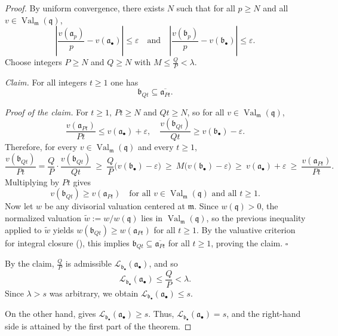 \documentclass[12pt]{amsart}
\newcommand{\m}{\mathfrak m}
\newcommand{\q}{\mathfrak q}
\renewcommand{\a}{\mathfrak{a}}
\renewcommand{\b}{\mathfrak{b}}
\newcommand{\Loj}{\mathcal{L}} %
\DeclareMathOperator{\Val}{Val}
\newcommand{\abul}{{\a_\bullet}}
\newcommand{\bbul}{{\b_\bullet}}
\theoremstyle{plain}
\theoremstyle{definition}
\numberwithin{equation}{section}
\begin{document}
\begin{proof}
	By uniform convergence, there exists $N$ such that for all $p\ge N$ and all $v\in\Val_{\m}(\q)$,
	\[
	\left|\frac{v(\a_p)}{p}-v(\abul)\right|\le \varepsilon
	\quad\text{and}\quad
	\left|\frac{v(\b_p)}{p}-v(\bbul)\right|\le \varepsilon.
	\]
	Choose integers $P\ge N$ and $Q\ge N$ with $M\le \frac{Q}{P}<\lambda.$

		\smallskip
		\noindent
		\emph{Claim.} For all integers $t \ge 1$ one has
		\[
		\b_{Qt}\subseteq \overline{\a_{Pt}}.
		\]
		
		\smallskip
		\noindent
		\emph{Proof of the claim.}
		For $t \ge 1$, $Pt\ge N$ and $Qt\ge N$, so for all $v\in\Val_{\m}(\q)$,
		\[
		\frac{v(\a_{Pt})}{Pt}\le v(\abul)+\varepsilon,
		\quad
		\frac{v(\b_{Qt})}{Qt}\ge v(\bbul)-\varepsilon.
		\]
		Therefore, for every $v\in\Val_{\m}(\q)$ and every $t\ge 1$,
		\[
		\frac{v(\b_{Qt})}{Pt}
		=
		\frac{Q}{P}\cdot \frac{v(\b_{Qt})}{Qt}
		\ \ge\
		\frac{Q}{P}\bigl(v(\bbul)-\varepsilon\bigr)
		\ \ge\
		M\bigl(v(\bbul)-\varepsilon\bigr)
		\ \ge\
		v(\abul)+\varepsilon
		\ \ge\
		\frac{v(\a_{Pt})}{Pt}.
		\]
		Multiplying by $Pt$ gives
		\[
		v(\b_{Qt})\ge v(\a_{Pt})\quad\text{for all }v\in\Val_{\m}(\q)\text{ and all }t\ge 1.
		\]
		Now let $w$ be any divisorial valuation centered at $\m$. Since $w(\q)>0$, the normalized valuation
		$\tilde w:=w/w(\q)$ lies in $\Val_{\m}(\q)$, so the previous inequality applied to $\tilde w$ yields
		$w(\b_{Qt})\ge w(\a_{Pt})$ for all $t\ge 1$.
		By the valuative criterion for integral closure (), this implies
		$\b_{Qt}\subseteq\overline{\a_{Pt}}$ for all $t\ge 1$, proving the claim.
		\hfill$\square$
		
		\smallskip
		By the claim, $\frac{Q}{P}$ is admissible $\Loj_{\bbul}(\abul)$, and so
		\[
		\Loj_{\bbul}(\abul)\le \frac{Q}{P}<\lambda.
		\]
		Since $\lambda>s$ was arbitrary, we obtain $\Loj_{\bbul}(\abul)\le s$.
		
		On the other hand,  gives $\Loj_{\bbul}(\abul)\ge s$.
		Thus, $\Loj_{\bbul}(\abul)=s$, and the right-hand side is attained by the first part of the theorem.
	\end{proof}
	
\end{document}
